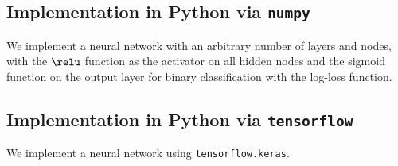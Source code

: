 

\subsection{Implementation in Python via \texttt{numpy}}
We implement a neural network with an arbitrary number of layers and nodes, with the $\relu$ function as the activator on all hidden nodes and the sigmoid function on the output layer for binary classification with the log-loss function.




\subsection{Implementation in Python via \texttt{tensorflow}}
We implement a neural network using \texttt{tensorflow.keras}.










